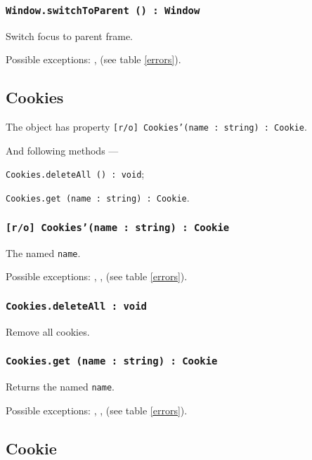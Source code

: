 \subsubsection{\texttt{Window.switchToParent () : Window}}

Switch focus to parent frame.

Possible exceptions: ,  (see table \ref{errors}).

\subsection{Cookies}

The object \cookies{} has property \texttt{[r/o] Cookies'(name : string) : Cookie}.

And following methods — 
\begin{icItems}
	\item \texttt{Cookies.deleteAll () : void};
	\item \texttt{Cookies.get (name : string) : Cookie}.
\end{icItems}

\subsubsection{\texttt{[r/o] Cookies'(name : string) : Cookie}}

The \cookie{} named \texttt{name}.

Possible exceptions: , ,  (see table \ref{errors}).

\subsubsection{\texttt{Cookies.deleteAll : void}}

Remove all cookies.

\subsubsection{\texttt{Cookies.get (name : string) : Cookie}}

Returns the \cookie{} named \texttt{name}.

Possible exceptions: , ,  (see table \ref{errors}).

\subsection{Cookie}

